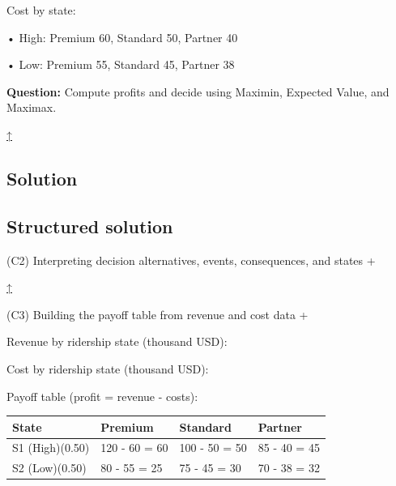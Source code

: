 \documentclass[11pt]{article}
\begin{document}
	Cost by state:
	
	
	
	• High: Premium 60, Standard 50, Partner 40
	
	
	
	• Low: Premium 55, Standard 45, Partner 38
	
	
	
	
	
	
	\textbf{Question:} Compute profits and decide using Maximin, Expected Value, and Maximax.
	
	\hyperref[problem3-criteria]{↑}
	
	\subsection*{Solution}
	
	\label{problem3-solution}\label{problem3-criteria}
	
	\subsection*{Structured solution}
	
	
	
	
	
	(C2) Interpreting decision alternatives, events, consequences, and states
	+
	
	
	
	
	
	\hyperref[problem3-criteria]{↑}
	
	
	
	
	(C3) Building the payoff table from revenue and cost data
	+
	
	
	Revenue by ridership state (thousand USD):
	
	Cost by ridership state (thousand USD):
	
	Payoff table (profit = revenue - costs):
	\begin{center}
		\begin{tabular}{llll}
			\toprule
			State & Premium & Standard & Partner \\
			\midrule
			S1 (High)\newline (0.50) & 120 - 60 = 60 & 100 - 50 = 50 & 85 - 40 = 45 \\
			S2 (Low)\newline (0.50) & 80 - 55 = 25 & 75 - 45 = 30 & 70 - 38 = 32 \\
			\bottomrule
		\end{tabular}
	\end{center}
	
\end{document}
